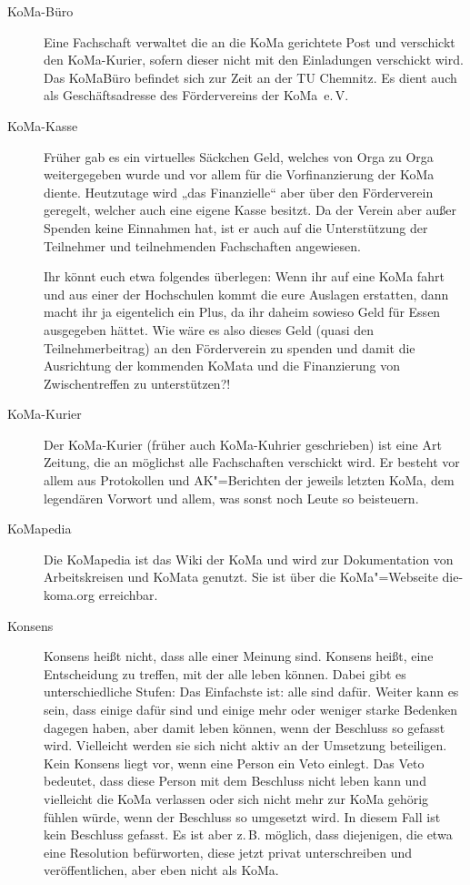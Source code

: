 \begin{description}
\item[KoMa-Büro] Eine Fachschaft verwaltet die an die KoMa gerichtete Post und
	verschickt den KoMa-Kurier, sofern dieser nicht mit den Einladungen
	verschickt wird. Das KoMaBüro befindet sich zur Zeit an der TU Chemnitz. Es
	dient auch als Geschäftsadresse des Fördervereins der KoMa~e.\,V.

\item[KoMa-Kasse] Früher gab es ein virtuelles Säckchen Geld, welches von Orga
	zu Orga weitergegeben wurde und vor allem für die Vorfinanzierung der KoMa
	diente. Heutzutage wird „das Finanzielle“ aber über den Förderverein
	geregelt, welcher auch eine eigene Kasse besitzt. Da der Verein aber außer
	Spenden keine Einnahmen hat, ist er auch auf die Unterstützung der
	Teilnehmer und teilnehmenden Fachschaften angewiesen.

	Ihr könnt euch etwa folgendes überlegen: Wenn ihr auf eine KoMa fahrt und
	aus einer der Hochschulen kommt die eure Auslagen erstatten, dann macht ihr
	ja eigentelich ein Plus, da ihr daheim sowieso Geld für Essen ausgegeben
	hättet.  Wie wäre es also dieses Geld (quasi den Teilnehmerbeitrag) an den
	Förderverein zu spenden und damit die Ausrichtung der kommenden KoMata und
	die Finanzierung von Zwischentreffen zu unterstützen?!

\item[KoMa-Kurier] Der KoMa-Kurier (früher auch KoMa-Kuhrier geschrieben) ist
	eine Art Zeitung, die an möglichst alle Fachschaften verschickt wird. Er
	besteht vor allem aus Protokollen und AK"=Berichten der jeweils letzten
	KoMa, dem legendären Vorwort und allem, was sonst noch Leute so beisteuern.

\item[KoMapedia] Die KoMapedia ist das Wiki der KoMa und wird zur Dokumentation
	von Arbeitskreisen und KoMata genutzt. Sie ist über die KoMa"=Webseite
	die-koma.org erreichbar.

\item[Konsens] Konsens heißt nicht, dass alle einer Meinung sind.  Konsens
	heißt, eine Entscheidung zu treffen, mit der alle leben können. Dabei gibt
	es unterschiedliche Stufen: Das Einfachste ist: alle sind dafür. Weiter
	kann es sein, dass einige dafür sind und einige mehr oder weniger starke
	Bedenken dagegen haben, aber damit leben können, wenn der Beschluss so
	gefasst wird. Vielleicht werden sie sich nicht aktiv an der Umsetzung
	beteiligen. Kein Konsens liegt vor, wenn eine Person ein Veto einlegt. Das
	Veto bedeutet, dass diese Person mit dem Beschluss nicht leben kann und
	vielleicht die KoMa verlassen oder sich nicht mehr zur KoMa gehörig fühlen
	würde, wenn der Beschluss so umgesetzt wird. In diesem Fall ist kein
	Beschluss gefasst.  Es ist aber z.\,B. möglich, dass diejenigen, die etwa
	eine Resolution befürworten, diese jetzt privat unterschreiben und
	veröffentlichen, aber eben nicht als KoMa.


\end{description}
